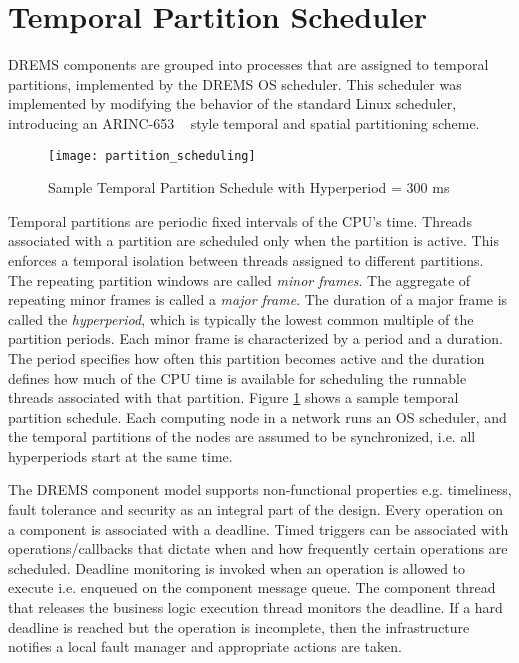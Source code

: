 \section{Temporal Partition Scheduler}

DREMS components are grouped into processes that are assigned to temporal partitions, implemented by the DREMS OS scheduler. This scheduler was implemented by modifying the behavior of the standard Linux scheduler, introducing an ARINC-653 ~\cite{ARINC-653} style temporal and spatial partitioning scheme. 

\begin{figure}[ht]
	\centering
	\texttt{[image: partition\_scheduling]}
	\caption{Sample Temporal Partition Schedule with Hyperperiod = 300 ms}
	\label{fig:partition_scheduling}
\end{figure}


Temporal partitions are periodic fixed intervals of the CPU's time. Threads associated with a partition are scheduled only when the partition is active. This enforces a temporal isolation between threads assigned to different partitions. The repeating partition windows are called \emph{minor frames}. The aggregate of repeating minor frames is called a \emph{major frame}. The duration of a major frame is called the \emph{hyperperiod}, which is typically the lowest common multiple of the partition periods. Each minor frame is characterized by a period and a duration. The period specifies how often this partition becomes active and the duration defines how much of the CPU time is available for scheduling the runnable threads associated with that partition. Figure \ref{fig:partition_scheduling} shows a sample temporal partition schedule. Each computing node in a network runs an OS scheduler, and the temporal partitions of the nodes are assumed to be synchronized, i.e. all hyperperiods start at the same time. 

The DREMS component model supports non-functional properties e.g. timeliness, fault tolerance and security as an integral part of the design. Every operation on a component is associated with a deadline. Timed triggers can be associated with operations/callbacks that dictate when and how frequently certain operations are scheduled. Deadline monitoring is invoked when an operation is allowed to execute i.e. enqueued on the component message queue. The component thread that releases the business logic execution thread monitors the deadline. If a hard deadline is reached but the operation is incomplete, then the infrastructure notifies a local fault manager and appropriate actions are taken. 

